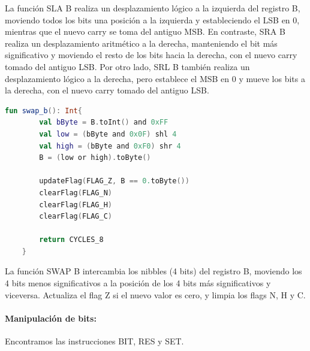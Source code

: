 La función SLA B realiza un desplazamiento lógico a la izquierda del registro B, moviendo todos los bits una posición a la izquierda y estableciendo el LSB en 0, mientras que el nuevo carry se toma del antiguo MSB. En contraste, SRA B realiza un desplazamiento aritmético a la derecha, manteniendo el bit más significativo y moviendo el resto de los bits hacia la derecha, con el nuevo carry tomado del antiguo LSB. Por otro lado, SRL B también realiza un desplazamiento lógico a la derecha, pero establece el MSB en 0 y mueve los bits a la derecha, con el nuevo carry tomado del antiguo LSB.

\begin{lstlisting}[language=Kotlin, caption={Operación SWAP}, label={code:kotlinswap}]
    fun swap_b(): Int{
        val bByte = B.toInt() and 0xFF
        val low = (bByte and 0x0F) shl 4
        val high = (bByte and 0xF0) shr 4
        B = (low or high).toByte()

        updateFlag(FLAG_Z, B == 0.toByte())
        clearFlag(FLAG_N)
        clearFlag(FLAG_H)
        clearFlag(FLAG_C)

        return CYCLES_8
    }
\end{lstlisting}

La función SWAP B intercambia los nibbles (4 bits) del registro B, moviendo los 4 bits menos significativos a la posición de los 4 bits más significativos y viceversa. Actualiza el flag Z si el nuevo valor es cero, y limpia los flags N, H y C.

\paragraph{Manipulación de bits:} Encontramos las instrucciones BIT, RES y SET.


